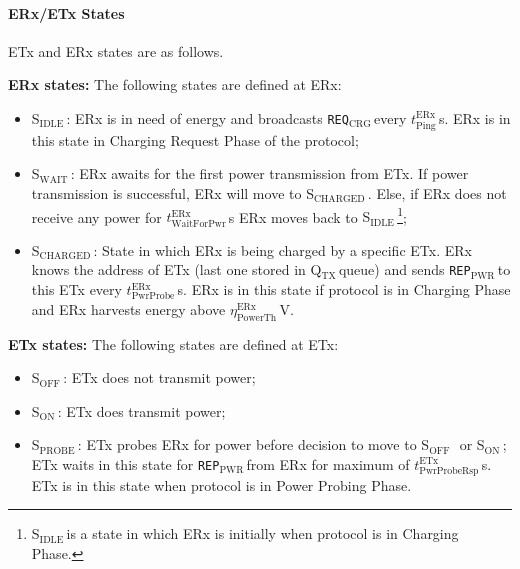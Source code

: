 \documentclass[11pt,draftclsnofoot,journal,onecolumn]{IEEEtran}
\newcommand{\textsubscript}[1]{$_{\text{#1}}$}
\newcommand{\txStateOff}{\textsf{S\textsubscript{OFF}}\,}
\newcommand{\txStateOn}{\textsf{S\textsubscript{ON}}\,}
\newcommand{\txStateProbe}{\textsf{S\textsubscript{PROBE}}\,}
\newcommand{\rxStateIdle}{\textsf{S\textsubscript{IDLE}}\,}
\newcommand{\rxStateWaiting}{\textsf{S\textsubscript{WAIT}}\,}
\newcommand{\rxStateCharged}{\textsf{S\textsubscript{CHARGED}}\,}
\newcommand{\txTimeoutPowerProbeResponse}{$t^{\text{ETx}}_\text{PwrProbeRsp}$}
\newcommand{\rxDelayPing}{$t^\text{ERx}_\text{Ping}$}
\newcommand{\rxDelayWaitingForPower}{$t^\text{ERx}_\text{WaitForPwr}$}
\newcommand{\rxDelayPowerProbing}{$t^\text{ERx}_\text{PwrProbe}$}
\newcommand{\rxVoltageThreshold}{$\eta^\text{ERx}_\text{PowerTh}$}
\newcommand{\chargingRequest}{\texttt{REQ\textsubscript{CRG}}\,}
\newcommand{\powerProbeReport}{\texttt{REP\textsubscript{PWR}}\,}
\newcommand{\txAddressQueue}{Q\textsubscript{TX}\,}
\newcommand{\subparagraph}{}
\begin{document}
\paragraph{ERx/ETx States}
\label{sec:messages}

ETx and ERx states are as follows.

\subparagraph{\textbf{ERx states:}}\label{sec:p1_erx_states} The following states are defined at ERx:

\begin{itemize}
\item \rxStateIdle: ERx is in need of energy and broadcasts \chargingRequest every \rxDelayPing\,s. ERx is in this state in Charging Request Phase of the protocol;

\item \rxStateWaiting: ERx awaits for the first power transmission from ETx. If power transmission is successful, ERx will move to \rxStateCharged. Else, if ERx does not receive any power for \rxDelayWaitingForPower\,s ERx moves back to \rxStateIdle\footnote{\rxStateIdle is a state in which ERx is initially when protocol is in Charging Phase.};

\item \rxStateCharged: State in which ERx is being charged by a specific ETx. ERx knows the address of ETx (last one stored in \txAddressQueue queue) and sends \powerProbeReport to this ETx every \rxDelayPowerProbing\,s. ERx is in this state if protocol is in Charging Phase and ERx harvests energy above \rxVoltageThreshold\,V.
\end{itemize}

\subparagraph{\textbf{ETx states:}} \label{sec:p1_etx_states} The following states are defined at ETx:

\begin{itemize}
\item \txStateOff: ETx does not transmit power;
\item \txStateOn: ETx does transmit power;
\item \txStateProbe: ETx probes ERx for power before decision to move to \txStateOff\ or \txStateOn; ETx waits in this state for \powerProbeReport from ERx for maximum of \txTimeoutPowerProbeResponse\,s. ETx is in this state when protocol is in Power Probing Phase.
\end{itemize}
\end{document}
